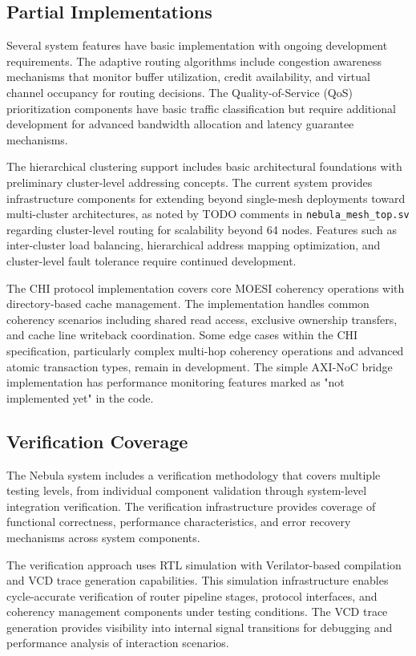 \documentclass[12pt,letterpaper]{article}
\begin{document}
\subsection{Partial Implementations}

Several system features have basic implementation with ongoing development requirements. The adaptive routing algorithms include congestion awareness mechanisms that monitor buffer utilization, credit availability, and virtual channel occupancy for routing decisions. The Quality-of-Service (QoS) prioritization components have basic traffic classification but require additional development for advanced bandwidth allocation and latency guarantee mechanisms.

The hierarchical clustering support includes basic architectural foundations with preliminary cluster-level addressing concepts. The current system provides infrastructure components for extending beyond single-mesh deployments toward multi-cluster architectures, as noted by TODO comments in \texttt{nebula\_mesh\_top.sv} regarding cluster-level routing for scalability beyond 64 nodes. Features such as inter-cluster load balancing, hierarchical address mapping optimization, and cluster-level fault tolerance require continued development.

The CHI protocol implementation covers core MOESI coherency operations with directory-based cache management. The implementation handles common coherency scenarios including shared read access, exclusive ownership transfers, and cache line writeback coordination. Some edge cases within the CHI specification, particularly complex multi-hop coherency operations and advanced atomic transaction types, remain in development. The simple AXI-NoC bridge implementation has performance monitoring features marked as "not implemented yet" in the code.

\subsection{Verification Coverage}

The Nebula system includes a verification methodology that covers multiple testing levels, from individual component validation through system-level integration verification. The verification infrastructure provides coverage of functional correctness, performance characteristics, and error recovery mechanisms across system components.

The verification approach uses RTL simulation with Verilator-based compilation and VCD trace generation capabilities. This simulation infrastructure enables cycle-accurate verification of router pipeline stages, protocol interfaces, and coherency management components under testing conditions. The VCD trace generation provides visibility into internal signal transitions for debugging and performance analysis of interaction scenarios.
\end{document}
